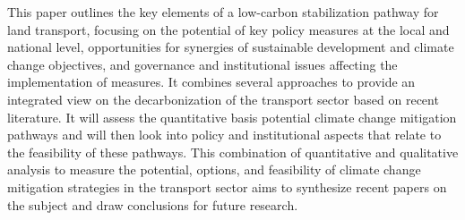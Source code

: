 This paper outlines the key elements of a low-carbon stabilization pathway for land transport, focusing on the potential of key policy measures at the local and national level, opportunities for synergies of sustainable development and climate change objectives, and governance and institutional issues affecting the implementation of measures. It combines several approaches to provide an integrated view on the decarbonization of the transport sector based on recent literature. It will assess the quantitative basis potential climate change mitigation pathways and will then look into policy and institutional aspects that relate to the feasibility of these pathways. This combination of quantitative and qualitative analysis to measure the potential, options, and feasibility of climate change mitigation strategies in the transport sector aims to synthesize recent papers on the subject and draw conclusions for future research.